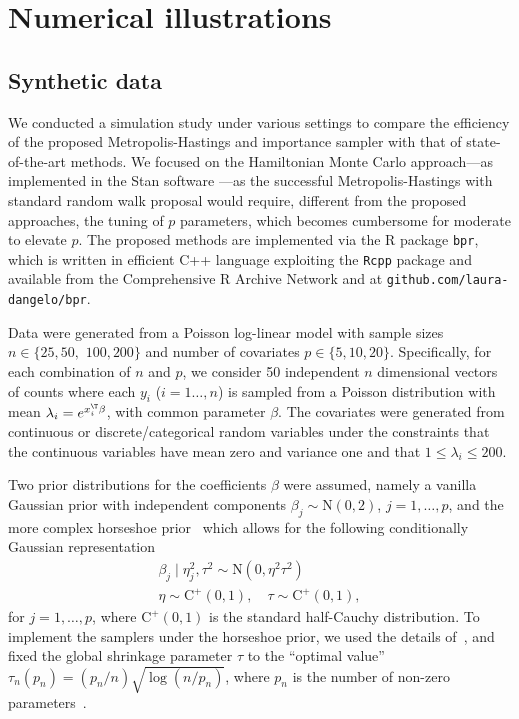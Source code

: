 \section{Numerical illustrations}
\label{ch2_sec:illustr}

\subsection{Synthetic data}
\label{ch2_sec:sim}

We conducted a simulation study under various settings to compare the efficiency of the proposed Metropolis-Hastings and importance sampler with that of state-of-the-art methods. We focused on the Hamiltonian Monte Carlo approach---as implemented in the Stan software \parencite{stan}---as the successful Metropolis-Hastings with standard random walk proposal would require, different from the proposed approaches, the tuning of $p$ parameters, which becomes cumbersome for moderate to elevate $p$. The proposed methods are implemented via the R package \texttt{bpr}, %
which is written in efficient C++ language exploiting the \texttt{Rcpp} package \parencite{RCPP} and available from the Comprehensive R Archive Network \parencite{bpr} and at \texttt{github.com/laura-dangelo/bpr}.

Data were generated from a Poisson log-linear model with sample sizes $n \in \{ 25, 50,$ $100, 200\}$ and number of covariates $p \in \{ 5, 10, 20\}$. 
Specifically, for each combination of $n$ and $p$, we consider 50 independent $n$ dimensional vectors of counts where each $y_i$ ($i = 1\dots, n$) is sampled from a Poisson distribution with mean $\lambda_i = e^{x_i^\T \beta}$, with common parameter $\beta$. The covariates were generated from continuous or discrete/categorical random variables under the constraints that the continuous variables have mean zero and variance one and that $1\leq \lambda_i \leq 200$. 

Two prior distributions for the coefficients $\beta$ were assumed, namely a vanilla Gaussian prior with independent components $\beta_j\sim \mathrm{N} (0,2)$, $j=1,\dots,p$, and the more complex horseshoe prior~\parencite{carvalho2010horseshoe} which allows for the following  conditionally Gaussian representation
\begin{gather*}
\beta_j \mid \eta^2_j, \tau^2 \sim \mathrm{N}(0,\eta^2\tau^2) \\
\eta \sim \mathrm{C}^+(0,1), \quad \tau \sim \mathrm{C}^+(0,1),
\end{gather*}
for $j=1,\dots,p$, where $\mathrm{C}^+(0,1)$ is the standard half-Cauchy distribution. To implement the samplers under the horseshoe prior, we used the details of~\textcite{makalic2016horseshoesampler}, and fixed the global shrinkage parameter $\tau$ to the ``optimal value'' $\tau_n(p_n) = (p_n/n)\sqrt{\log(n/p_n)}$, where $p_n$ is the number of non-zero parameters~\parencite{vanderpas2017}. 

